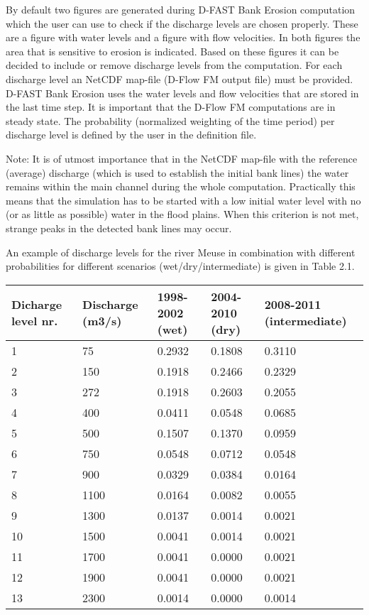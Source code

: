 By default two figures are generated during D-FAST Bank Erosion computation which the user can use to check if the discharge levels are chosen properly.
These are a figure with water levels and a figure with flow velocities.
In both figures the area that is sensitive to erosion is indicated.
Based on these figures it can be decided to include or remove discharge levels from the computation.
For each discharge level an NetCDF map-file (D-Flow FM output file) must be provided.
D-FAST Bank Erosion uses the water levels and flow velocities that are stored in the last time step.
It is important that the D-Flow FM computations are in steady state.
The probability (normalized weighting of the time period) per discharge level is defined by the user in the definition file.

Note: It is of utmost importance that in the NetCDF map-file with the reference (average) discharge (which is used to establish the initial bank lines) the water remains within the main channel during the whole computation.
Practically this means that the simulation has to be started with a low initial water level with no (or as little as possible) water in the flood plains.
When this criterion is not met, strange peaks in the detected bank lines may occur.



An example of discharge levels for the river Meuse in combination with different probabilities for different scenarios (wet/dry/intermediate) is given in Table 2.1.

\begin{tabular}{lllll}
Dicharge level nr. & Discharge (m3/s) & 1998-2002 (wet) & 2004-2010 (dry) & 2008-2011 (intermediate) \\ \hline
1 & 75 & 0.2932 & 0.1808 & 0.3110 \\
2 & 150 & 0.1918 & 0.2466 & 0.2329 \\
3 & 272 & 0.1918 & 0.2603 & 0.2055 \\
4 & 400 & 0.0411 & 0.0548 & 0.0685 \\
5 & 500 & 0.1507 & 0.1370 & 0.0959 \\
6 & 750 & 0.0548 & 0.0712 & 0.0548 \\
7 & 900 & 0.0329 & 0.0384 & 0.0164 \\
8 & 1100 & 0.0164 & 0.0082 & 0.0055 \\
9 & 1300 & 0.0137 & 0.0014 & 0.0021 \\
10 & 1500 & 0.0041 & 0.0014 & 0.0021 \\
11 & 1700 & 0.0041 & 0.0000 & 0.0021 \\
12 & 1900 & 0.0041 & 0.0000 & 0.0021 \\
13 & 2300 & 0.0014 & 0.0000 & 0.0014 \hline
\end{tabular}

